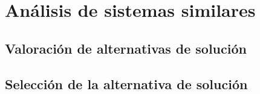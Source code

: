 \section{Análisis de sistemas similares}



\subsection{Valoración de alternativas de solución}


\subsection{Selección de la alternativa de solución}
